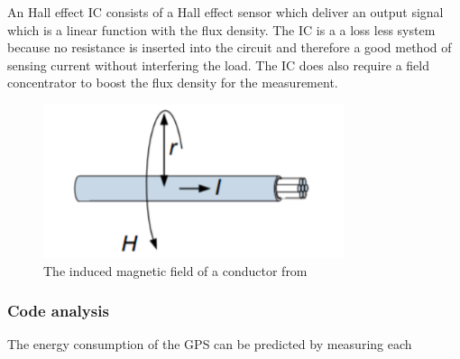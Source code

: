 An Hall effect IC consists of a Hall effect sensor which deliver an output signal which is a linear function with the flux density. The IC is a a loss less system because no resistance is inserted into the circuit and therefore a good method of sensing current without interfering the load.  The IC does also require a field concentrator to boost the flux density for the measurement.
\begin{figure}[h]
\centering
\includegraphics[height=4.5cm]{Project_Report/Images/current.PNG}
\caption{The induced magnetic field of a conductor from \cite{Infineon}}
\label{fig:current}
\end{figure}


\subsubsection{Code analysis}

The energy consumption of the GPS can be predicted by measuring each 